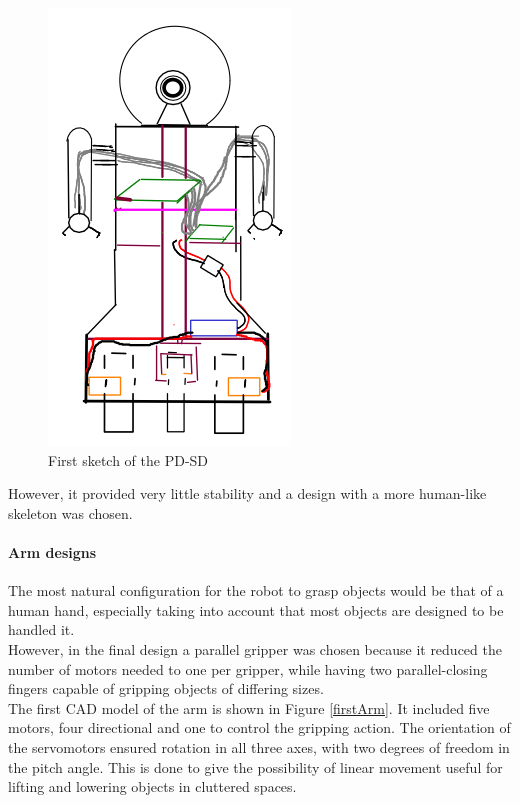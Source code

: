 	\begin{figure}[H]
			\centering
			\includegraphics[scale=0.4]{images/Diagrams/exoskeleton}
			\caption{First sketch of the PD-SD}
			\label{exoskeleton}
	\end{figure}
	\bigskip

However, it provided very little stability and a design with a more human-like skeleton was chosen.\\


\paragraph{Arm designs} The most natural configuration for the robot to grasp objects would be that of a human hand, especially taking into account that most objects are designed to be handled it.\\

However, in the final design a parallel gripper was chosen because it reduced the number of motors needed to one per gripper, while having two parallel-closing fingers capable of gripping objects of differing sizes.\\

The first CAD model of the arm is shown in Figure \ref{firstArm}. It included five motors, four directional and one to control the gripping action. The orientation of the servomotors ensured rotation in all three axes, with two degrees of freedom in the pitch angle. This is done to give the possibility of linear movement useful for lifting and lowering objects in cluttered spaces.  
\\	

